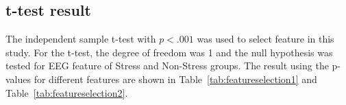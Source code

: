 \documentclass[pdflatex,sn-mathphys]{sn-jnl}%
\theoremstyle{thmstyleone}%
\theoremstyle{thmstyletwo}%
\theoremstyle{thmstylethree}%
\begin{document}
\subsection{t-test result}
The independent sample t-test with $p < .001$ was used to select feature in this study. For the t-test, the degree of freedom was 1 and the null hypothesis was tested for EEG feature of Stress and Non-Stress groups. The result using the p-values for different features are shown in Table~\ref{tab:featureselection1} and Table~\ref{tab:featureselection2}. 

\end{document}
